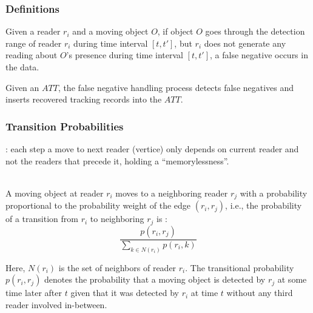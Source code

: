 
\begin{frame}
\frametitle{Definitions}

\begin{definition}
  Given a reader $r_i$ and a moving object $O$, if object $O$ goes through the detection range of reader $r_i$ during time interval $[t, t']$, but $r_i$ does not generate any reading about $O$'s presence during time interval $[t, t']$, a false negative occurs in the data.
\end{definition}

\begin{definition}
  Given an $ATT$, the false negative handling process detects false negatives and inserts recovered tracking records into the $ATT$.
\end{definition}

\end{frame}


\begin{frame}
\frametitle{Transition Probabilities}

: each step a move to next reader (vertice) only depends on current reader and not the readers that precede it, holding a ``memorylessness''.\\~\\ \pause

A moving object at reader $r_i$ moves to a neighboring reader $r_j$ with a probability proportional to the probability weight of the edge $(r_i, r_j)$, i.e., the probability of a transition from $r_i$ to neighboring $r_j$ is : \pause
\begin{equation}
  \frac{p(r_i, r_j)}{\sum_{k \in N(r_i)}p(r_i, k)}
\end{equation}

\pause
Here, $N(r_i)$ is the set of neighbors of reader $r_i$. The transitional probability $p(r_i, r_j)$ denotes the probability that a moving object is detected by $r_j$ at some time later after $t$ given that it was detected by $r_i$ at time $t$ without any third reader involved in-between.

\end{frame}


